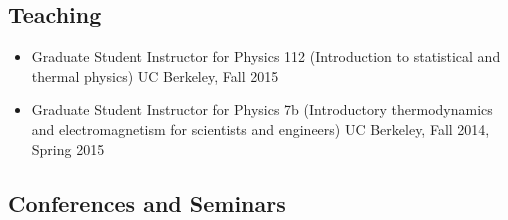 \documentclass[]{article}
\begin{document}
\subsection*{Teaching}
\begin{itemize}
	\item Graduate Student Instructor for Physics 112 (Introduction to statistical and thermal physics) UC Berkeley, Fall 2015
	
	\item Graduate Student Instructor for Physics 7b (Introductory thermodynamics and electromagnetism for scientists and engineers)  UC Berkeley, Fall 2014, Spring 2015
\end{itemize}


\subsection*{Conferences and Seminars}
\end{document}
